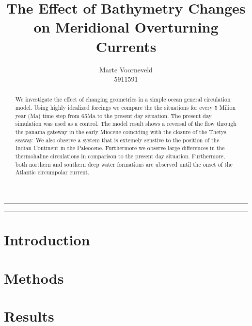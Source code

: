 \documentclass[a4paper]{article}
\title{The Effect of Bathymetry Changes on Meridional Overturning Currents}
\author{Marte Voorneveld\\
		5911591}
\begin{document}
\maketitle
\noindent\rule{\textwidth}{1pt}
\begin{abstract}
We investigate the effect of changing geometries in a simple ocean general circulation model. Using highly idealized forcings we compare the the situations for every 5 Milion year (Ma) time step from 65Ma to the present day situation. The present day simulation was used as a control. The model result shows a reversal of the flow through the panama gateway in the early Miocene coinciding with the closure of the Thetys seaway. We also observe a system that is extemely senstive to the position of the Indian Continent in the Paleocene. Furthermore we observe large differences in the thermohaline circulations in comparison to the present day situation. Furthermore, both northern and southern deep water formations are ubserved until the onset of the Atlantic circumpolar current.
\end{abstract}
\noindent\rule{\textwidth}{1pt}
\begin{multicols}{2}
\section{Introduction}


\section{Methods}














\section{Results}





\end{multicols}
\end{document}
